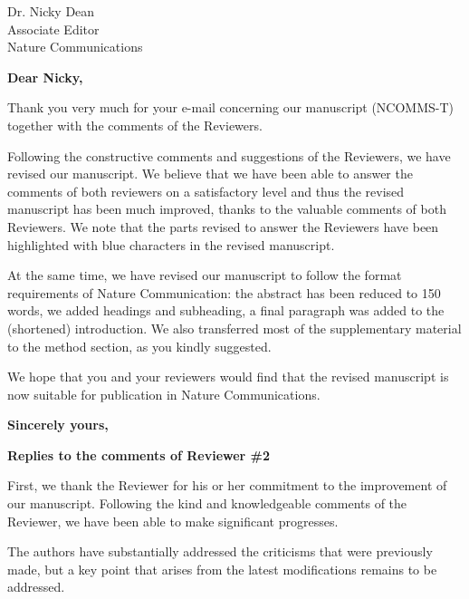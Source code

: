 \documentclass[a4paper, rebuttal, parskip=true, firsthead=false, fromemail=true, foldmarks=false]{scrlttr2}
\begin{document}
 
\begin{letter}{Dr. Nicky Dean\\
Associate Editor\\
Nature Communications}
\opening{\bf Dear Nicky,}

Thank you very much for your e-mail concerning our manuscript (NCOMMS\nobreakdash-T) together with the comments of the Reviewers. 

Following the constructive comments and suggestions of the Reviewers, we have revised our manuscript. 
We believe that we have been able to answer the comments of both reviewers on a satisfactory level and thus the revised manuscript has been much improved, thanks to the valuable comments of both Reviewers. We note that the parts revised to answer the Reviewers have been highlighted with blue characters in the revised manuscript.

At the same time, we have revised our manuscript to follow the format requirements of Nature Communication: the abstract has been reduced to 150 words, we added headings and subheading, a final paragraph was added to the (shortened) introduction. We also transferred most of the supplementary material to the method section, as you kindly suggested.


We hope that you and your reviewers would find that the revised manuscript is now suitable for publication in Nature Communications. 

\closing{\bf Sincerely yours,} 

\textsf{\textbf{Replies to the comments of Reviewer \#2}}

First, we thank the Reviewer for his or her commitment to the improvement of our manuscript. Following the kind and knowledgeable comments of the Reviewer, we have been able to make significant progresses.

\begin{quotationi}
The authors have substantially addressed the criticisms that were previously made, but a key point that arises from the latest modifications remains to be addressed.


\end{quotationi}
\end{letter}
\end{document}
